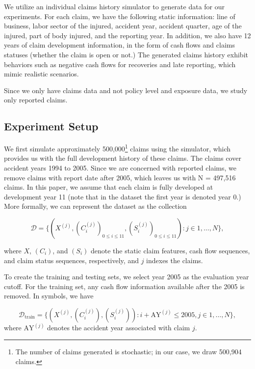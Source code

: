 \documentclass{article}
\begin{document}
We utilize an individual claims history simulator \cite{gabrielli2018individual} to generate data for our experiments. For each claim, we have the following static information: line of business, labor sector of the injured, accident year, accident quarter, age of the injured, part of body injured, and the reporting year. In addition, we also have 12 years of claim development information, in the form of cash flows and claims statuses (whether the claim is open or not.) The generated claims history exhibit behaviors such as negative cash flows for recoveries and late reporting, which mimic realistic scenarios.

Since we only have claims data and not policy level and exposure data, we study only reported claims.

\subsection{Experiment Setup}

We first simulate approximately 500,000\footnote{The number of claims generated is stochastic; in our case, we draw 500,904 claims.} claims using the simulator, which provides us with the full development history of these claims. The claims cover accident years 1994 to 2005. Since we are concerned with reported claims, we remove claims with report date after 2005, which leaves us with N = 497,516 claims. In this paper, we assume that each claim is fully developed at development year 11 (note that in the dataset the first year is denoted year 0.) More formally, we can represent the dataset as the collection

\begin{equation}
    \mathcal{D} = \{ (X^{(j)}, (C_i^{(j)})_{0 \leq i \leq 11}, (S_i^{(j)})_{0 \leq i \leq 11}): j\in {1,\dots, N}\},
\end{equation}

where $X$, $(C_i)$, and $(S_i)$ denote the static claim features, cash flow sequences, and claim status sequences, respectively, and $j$ indexes the claims.

To create the training and testing sets, we select year 2005 as the evaluation year cutoff. For the training set, any cash flow information available after the 2005 is removed. In symbols, we have

\begin{equation}
    \mathcal{D}_{\text{train}} = \{ (X^{(j)}, (C_i^{(j)}), (S_i^{(j)})): i + \text{AY}^{(j)} \leq 2005, j \in {1,\dots, N}\},
\end{equation}
where $\text{AY}^{(j)}$ denotes the accident year associated with claim $j$.
\end{document}
